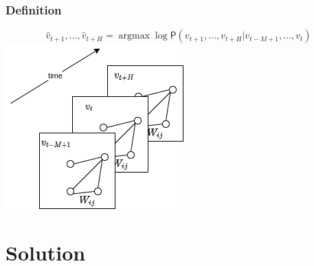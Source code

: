\documentclass{beamer}
\begin{document}
\begin{frame}
  \frametitle{Definition}
  \begin{equation}
    \label{eq:base}
    \hat{v}_{t+1}, \ldots,  \hat{v}_{t+H} = \mathop{\mathrm{argmax}} \log \mathsf{P}({v}_{t+1}, \ldots,  v_{t+H} | v_{t-M+1} , \ldots,  v_{t})
  \end{equation}
  \centering
  \includegraphics[height=.5\textheight]{img/base.png}
\end{frame}

\section{Solution}
\end{document}
